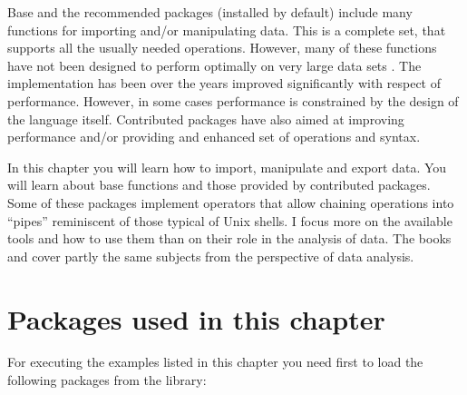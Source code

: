 \documentclass[krantz2]{krantz}\usepackage{knitr}%
\begin{document}
Base \Rlang and the recommended packages (installed by default) include many functions for importing and/or manipulating data. This is a complete set, that supports all the usually needed operations. However, many of these functions have not been designed to perform optimally on very large data sets \autocite[see][]{Matloff2011}. The \Rlang implementation has been over the years improved significantly with respect of performance. However, in some cases performance is constrained by the design of the \Rlang language itself. Contributed packages have also aimed at improving performance and/or providing and enhanced set of operations and syntax.

In this chapter you will learn how to import, manipulate and export data. You will learn about base \Rlang functions and those provided by contributed packages. Some of these packages implement operators that allow chaining operations into ``pipes'' reminiscent of those typical of Unix shells. I focus more on the available tools and how to use them than on their role in the analysis of data. The books  \autocite{Wickham2017} and  \autocite{Peng2016} cover partly the same subjects from the perspective of data analysis.

\section{Packages used in this chapter}

\begin{knitrout}\footnotesize
{}\color{fgcolor}\begin{kframe}
\begin{alltt}
\hlopt{::}
\end{alltt}
\end{kframe}
\end{knitrout}

For executing the examples listed in this chapter you need first to load the following packages from the library:

\begin{knitrout}\footnotesize
{}\color{fgcolor}\begin{kframe}
\begin{alltt}
\end{alltt}
\end{kframe}
\end{knitrout}
\end{document}
